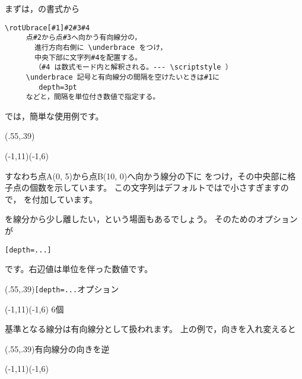 まずは，の書式から
\begin{boxnote}
\begin{verbatim}
\rotUbrace[#1]#2#3#4
     点#2から点#3へ向かう有向線分の，
       進行方向右側に \underbrace をつけ，
       中央下部に文字列#4を配置する。
       （#4 は数式モード内と解釈される。--- \scriptstyle ）
     \underbrace 記号と有向線分の間隔を空けたいときは#1に
        depth=3pt
     などと，間隔を単位付き数値で指定する。
\end{verbatim}
\end{boxnote}

では，簡単な使用例です。
\begin{showEx}(.55,.39){}
\footnotesize
\begin{zahyou}[ul=4mm](-1,11)(-1,6)%
%
\Put{}\Put{}%
%
\Tyokusen\A\B{}{}%
\rotUbrace\A{}%
\end{zahyou}
\end{showEx}
すなわち点A(0, 5)から点B(10, 0)へ向かう線分の下に
をつけ，その中央部に格子点の個数を示しています。
この文字列はデフォルトではで小さすぎますので，
を付加しています。

を線分から少し離したい，という場面もあるでしょう。
そのためのオプションが
\begin{jquote}
  \verb+[depth=...]+
\end{jquote}
です。右辺値は単位を伴った数値です。

\begin{showEx}(.55,.39){\texttt{[depth=...}オプション}
\footnotesize
\begin{zahyou}[ul=4mm](-1,11)(-1,6)%
%
\Put{}\Put{}%
%
\Tyokusen\A\B{}{}%
\rotUbrace[depth=3pt]\A\B%
  {\textstyle 6個}%
\end{zahyou}
\end{showEx}

基準となる線分は有向線分として扱われます。
上の例で，向きを入れ変えると

\begin{showEx}(.55,.39){有向線分の向きを逆}
\footnotesize
\begin{zahyou}[ul=4mm](-1,11)(-1,6)%
%
\Put{}\Put{}%
%
\Tyokusen\A\B{}{}%
\rotUbrace\B{}%
\end{zahyou}
\end{showEx}

